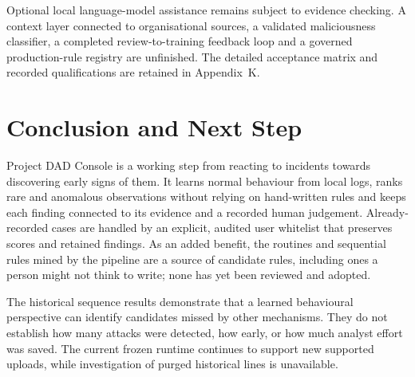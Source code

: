 \documentclass[11pt,a4paper]{article}
\begin{document}
Optional local language-model assistance remains subject to evidence checking. A context layer connected to organisational sources, a validated maliciousness classifier, a completed review-to-training feedback loop and a governed production-rule registry are unfinished. The detailed acceptance matrix and recorded qualifications are retained in Appendix~K.

\clearpage
\section{Conclusion and Next Step}\label{sec:core-conclusion}

Project DAD Console is a working step from reacting to incidents towards discovering early signs of them. It learns normal behaviour from local logs, ranks rare and anomalous observations without relying on hand-written rules and keeps each finding connected to its evidence and a recorded human judgement. Already-recorded cases are handled by an explicit, audited user whitelist that preserves scores and retained findings. As an added benefit, the routines and sequential rules mined by the pipeline are a source of candidate rules, including ones a person might not think to write; none has yet been reviewed and adopted.

The historical sequence results demonstrate that a learned behavioural perspective can identify candidates missed by other mechanisms. They do not establish how many attacks were detected, how early, or how much analyst effort was saved. The current frozen runtime continues to support new supported uploads, while investigation of purged historical lines is unavailable.
\end{document}
